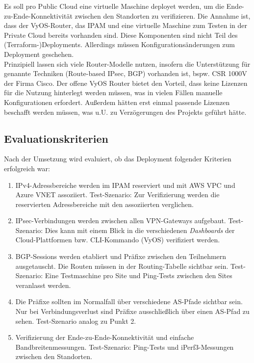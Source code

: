Es soll pro Public Cloud eine virtuelle Maschine deployet werden, um die Ende-zu-Ende-Konnektivität zwischen den Standorten zu verifizieren.
Die Annahme ist, dass der VyOS-Router, das IPAM und eine virtuelle Maschine zum Testen in der Private Cloud bereits vorhanden sind. Diese Komponenten sind nicht Teil des (Terraform-)Deployments. Allerdings müssen Konfigurationsänderungen zum Deployment geschehen.\\
Prinzipiell lassen sich viele Router-Modelle nutzen, insofern die Unterstützung für genannte Techniken (Route-based IPsec, BGP) vorhanden ist, bspw. CSR 1000V der Firma Cisco\cite{Durai2016}. Der offene VyOS Router bietet den Vorteil, dass keine Lizenzen für die Nutzung hinterlegt werden müssen, was in vielen Fällen manuelle Konfigurationen erfordert. Außerdem hätten erst einmal passende Lizenzen beschafft werden müssen, was u.U. zu Verzögerungen des Projekts geführt hätte.





\subsection{Evaluationskriterien}\label{eval-kriterien-uc1}
Nach der Umsetzung wird evaluiert, ob das Deployment folgender Kriterien erfolgreich war:
\begin{enumerate}
    \item IPv4-Adressbereiche werden im IPAM reserviert und mit AWS VPC und Azure VNET assoziiert. Test-Szenario: Zur Verifizierung werden die reservierten Adressbereiche mit den assoziierten verglichen.
    \item IPsec-Verbindungen werden zwischen allen VPN-Gateways aufgebaut. Test-Szenario: Dies kann mit einem Blick in die verschiedenen \textit{Dashboards} der Cloud-Plattformen bzw. CLI-Kommando (VyOS) verifiziert werden.
    \item BGP-Sessions werden etabliert und Präfixe zwischen den Teilnehmern ausgetauscht. Die Routen müssen in der Routing-Tabelle sichtbar sein. Test-Szenario: Eine Testmaschine pro Site und Ping-Tests zwischen den Sites veranlasst werden.
    \item Die Präfixe sollten im Normalfall über verschiedene AS-Pfade sichtbar sein. Nur bei Verbindungsverlust sind Präfixe ausschließlich über einen AS-Pfad zu sehen. Test-Szenario analog zu Punkt 2.
    \item Verifizierung der Ende-zu-Ende-Konnektivität und einfache Bandbreitenmessungen. Test-Szenario: Ping-Tests und iPerf3-Messungen zwischen den Standorten.
\end{enumerate}